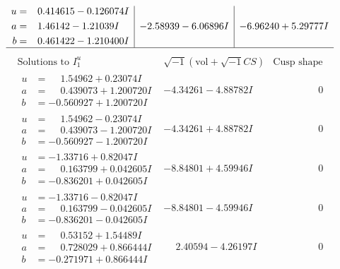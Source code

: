 \documentclass[1p]{elsarticle_modified}
\theoremstyle{definition}
\newcommand{\I}{\sqrt{-1}}
\begin{document}
$$\begin{array}{c|c|c}
\begin{aligned}
u &= \phantom{-}0.414615 - 0.126074 I \\
a &= \phantom{-}1.46142 - 1.21039 I \\
b &= \phantom{-}0.461422 - 1.210400 I\end{aligned}
 & -2.58939 - 6.06896 I & -6.96240 + 5.29777 I\\
 \hline 
 \end{array}$$\newpage$$\begin{array}{c|c|c}  
\text{Solutions to }I^u_{1}& \I (\text{vol} + \sqrt{-1}CS) & \text{Cusp shape}\\
 \hline 
\begin{aligned}
u &= \phantom{-}1.54962 + 0.23074 I \\
a &= \phantom{-}0.439073 + 1.200720 I \\
b &= -0.560927 + 1.200720 I\end{aligned}
 & -4.34261 - 4.88782 I & \phantom{-0.000000 } 0 \\ \hline\begin{aligned}
u &= \phantom{-}1.54962 - 0.23074 I \\
a &= \phantom{-}0.439073 - 1.200720 I \\
b &= -0.560927 - 1.200720 I\end{aligned}
 & -4.34261 + 4.88782 I & \phantom{-0.000000 } 0 \\ \hline\begin{aligned}
u &= -1.33716 + 0.82047 I \\
a &= \phantom{-}0.163799 + 0.042605 I \\
b &= -0.836201 + 0.042605 I\end{aligned}
 & -8.84801 + 4.59946 I & \phantom{-0.000000 } 0 \\ \hline\begin{aligned}
u &= -1.33716 - 0.82047 I \\
a &= \phantom{-}0.163799 - 0.042605 I \\
b &= -0.836201 - 0.042605 I\end{aligned}
 & -8.84801 - 4.59946 I & \phantom{-0.000000 } 0 \\ \hline\begin{aligned}
u &= \phantom{-}0.53152 + 1.54489 I \\
a &= \phantom{-}0.728029 + 0.866444 I \\
b &= -0.271971 + 0.866444 I\end{aligned}
 & \phantom{-}2.40594 - 4.26197 I & \phantom{-0.000000 } 0 \\ \hline\begin{aligned}

\end{aligned}
\end{array}$$
\end{document}
